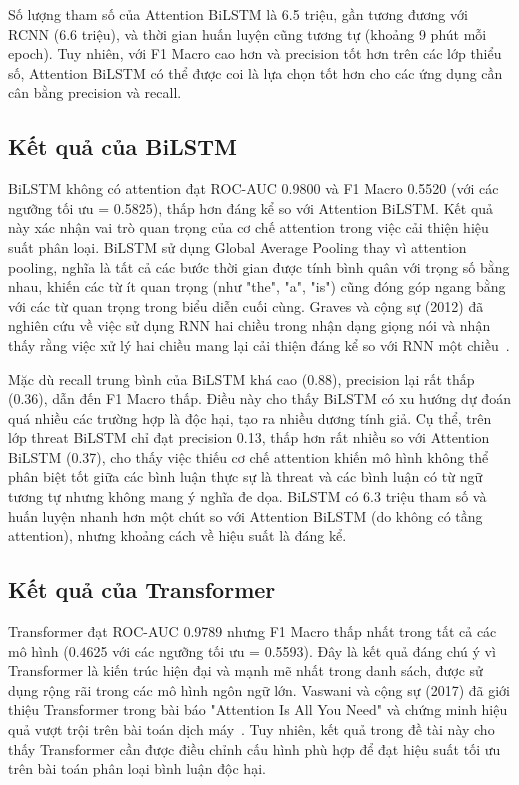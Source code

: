 \documentclass[../BTL.tex]{subfiles}
\begin{document}
Số lượng tham số của Attention BiLSTM là 6.5 triệu, gần tương đương với RCNN (6.6 triệu), và thời gian huấn luyện cũng tương tự (khoảng 9 phút mỗi epoch). Tuy nhiên, với F1 Macro cao hơn và precision tốt hơn trên các lớp thiểu số, Attention BiLSTM có thể được coi là lựa chọn tốt hơn cho các ứng dụng cần cân bằng precision và recall.

\subsection{Kết quả của BiLSTM}
BiLSTM không có attention đạt ROC-AUC 0.9800 và F1 Macro 0.5520 (với các ngưỡng tối ưu = 0.5825), thấp hơn đáng kể so với Attention BiLSTM. Kết quả này xác nhận vai trò quan trọng của cơ chế attention trong việc cải thiện hiệu suất phân loại. BiLSTM sử dụng Global Average Pooling thay vì attention pooling, nghĩa là tất cả các bước thời gian được tính bình quân với trọng số bằng nhau, khiến các từ ít quan trọng (như "the", "a", "is") cũng đóng góp ngang bằng với các từ quan trọng trong biểu diễn cuối cùng. Graves và cộng sự (2012) đã nghiên cứu về việc sử dụng RNN hai chiều trong nhận dạng giọng nói và nhận thấy rằng việc xử lý hai chiều mang lại cải thiện đáng kể so với RNN một chiều~\cite{graves2012supervised}.

Mặc dù recall trung bình của BiLSTM khá cao (0.88), precision lại rất thấp (0.36), dẫn đến F1 Macro thấp. Điều này cho thấy BiLSTM có xu hướng dự đoán quá nhiều các trường hợp là độc hại, tạo ra nhiều dương tính giả. Cụ thể, trên lớp threat BiLSTM chỉ đạt precision 0.13, thấp hơn rất nhiều so với Attention BiLSTM (0.37), cho thấy việc thiếu cơ chế attention khiến mô hình không thể phân biệt tốt giữa các bình luận thực sự là threat và các bình luận có từ ngữ tương tự nhưng không mang ý nghĩa đe dọa. BiLSTM có 6.3 triệu tham số và huấn luyện nhanh hơn một chút so với Attention BiLSTM (do không có tầng attention), nhưng khoảng cách về hiệu suất là đáng kể.

\subsection{Kết quả của Transformer}
Transformer đạt ROC-AUC 0.9789 nhưng F1 Macro thấp nhất trong tất cả các mô hình (0.4625 với các ngưỡng tối ưu = 0.5593). Đây là kết quả đáng chú ý vì Transformer là kiến trúc hiện đại và mạnh mẽ nhất trong danh sách, được sử dụng rộng rãi trong các mô hình ngôn ngữ lớn. Vaswani và cộng sự (2017) đã giới thiệu Transformer trong bài báo "Attention Is All You Need" và chứng minh hiệu quả vượt trội trên bài toán dịch máy~\cite{vaswani2017transformer}. Tuy nhiên, kết quả trong đề tài này cho thấy Transformer cần được điều chỉnh cấu hình phù hợp để đạt hiệu suất tối ưu trên bài toán phân loại bình luận độc hại.
\end{document}
